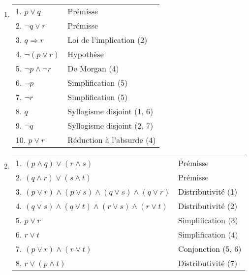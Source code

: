 \begin{enumerate}
	\item  \hspace{1em}
    \begin{center}
    \begin{tabular}{|l|l|}
    \hline
    1. $p \lor q$ & Prémisse \\
    2. $\lnot q \lor r$ & Prémisse \\
    3. $q \Rightarrow r$ & Loi de l'implication (2) \\
    \hspace{0.5cm} 4. $\lnot(p \lor r)$ & Hypothèse \\
    \hspace{0.5cm} 5. $\lnot p \land \lnot r$ & De Morgan (4) \\
    \hspace{0.5cm} 6. $\lnot p$ & Simplification (5) \\
    \hspace{0.5cm} 7. $\lnot r$ & Simplification (5) \\
    \hspace{0.5cm} 8. $q$ & Syllogisme disjoint (1, 6) \\
    \hspace{0.5cm} 9. $\lnot q$ & Syllogisme disjoint (2, 7) \\
    10. $p \lor r$ & Réduction à l'absurde (4)\\
    \hline
    \end{tabular}
    \end{center}

	\item  \hspace{1em}
    \begin{center}
    \begin{tabular}{|l|l|}
    \hline
    1. $(p \land q) \lor (r \land s)$ & Prémisse \\
    2. $(q \land r) \lor (s \land t)$ & Prémisse \\
    3. $(p \lor r) \land (p \lor s) \land (q \lor s) \land (q \lor r)$ & Distributivité (1) \\
    4. $(q \lor s) \land (q \lor t) \land (r \lor s) \land (r \lor t)$ & Distributivité (2) \\
    5. $p \lor r$ & Simplification (3) \\
    6. $r \lor t$ & Simplification (4) \\
    7. $(p \lor r) \land (r \lor t)$ & Conjonction (5, 6) \\
    8. $r \lor (p \land t)$ & Distributivité (7) \\
    \hline
    \end{tabular}
    \end{center}
\end{enumerate}

